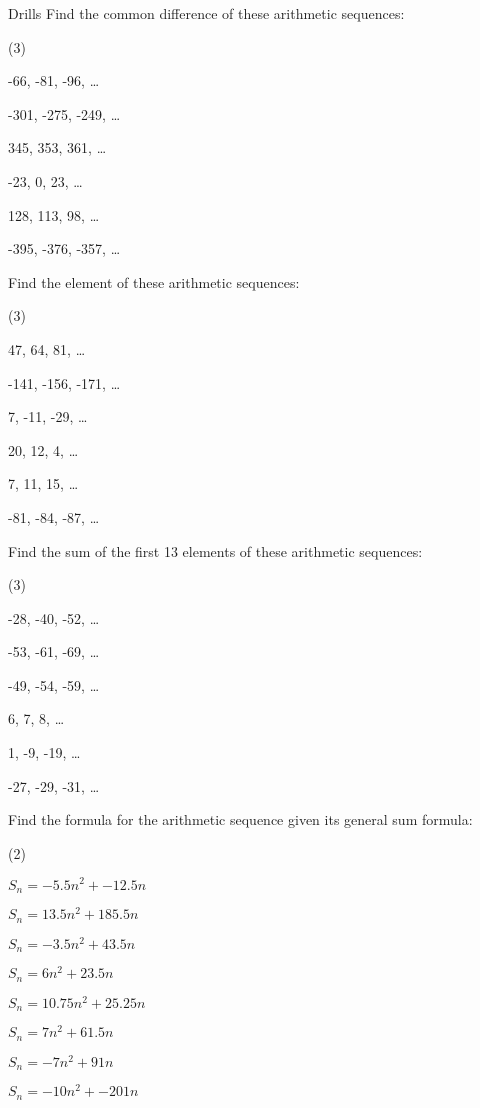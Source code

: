\documentclass[../../main.tex]{subfiles}
\begin{document}
\begin{questions}{Drills}
Find the common difference of these arithmetic sequences:
\begin{question_set}(3)
    \item -66, -81, -96, \ldots
    \item -301, -275, -249, \ldots
    \item 345, 353, 361, \ldots
    \item -23, 0, 23, \ldots
    \item 128, 113, 98, \ldots
    \item -395, -376, -357, \ldots
\end{question_set}

Find the  element of these arithmetic sequences:
\begin{question_set}(3)
    \item 47, 64, 81, \ldots
    \item -141, -156, -171, \ldots
    \item 7, -11, -29, \ldots
    \item 20, 12, 4, \ldots
    \item 7, 11, 15, \ldots
    \item -81, -84, -87, \ldots
\end{question_set}

Find the sum of the first 13 elements of these arithmetic sequences:
\begin{question_set}(3)
    \item -28, -40, -52, \ldots
    \item -53, -61, -69, \ldots
    \item -49, -54, -59, \ldots
    \item 6, 7, 8, \ldots
    \item 1, -9, -19, \ldots
    \item -27, -29, -31, \ldots
\end{question_set}

Find the formula for the arithmetic sequence given its general sum formula:
\begin{question_set}(2)
    \item \(S_n=-5.5n^2 + -12.5n\)
    \item \(S_n=13.5n^2 + 185.5n\)
    \item \(S_n=-3.5n^2 + 43.5n\)
    \item \(S_n=6n^2 + 23.5n\)
    \item \(S_n=10.75n^2 + 25.25n\)
    \item \(S_n=7n^2 + 61.5n\)
    \item \(S_n=-7n^2 + 91n\)
    \item \(S_n=-10n^2 + -201n\)
\end{question_set}
\end{questions}
\end{document}
